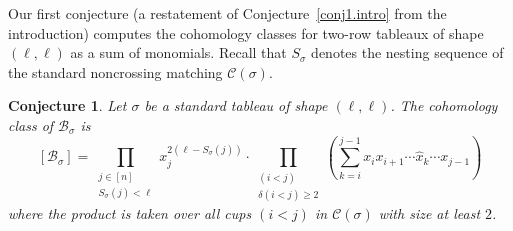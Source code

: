 \documentclass[11pt]{amsart}
\newtheorem{conj}[theorem]{Conjecture}
\theoremstyle{remark}
\theoremstyle{remark}
\theoremstyle{definition}
\theoremstyle{definition}
\theoremstyle{definition}
\numberwithin{equation}{section}
\newcommand{\gs}{\sigma}
\newcommand{\cb}{\mathcal{B}}
\newcommand{\cc}{\mathcal{C}}
\newcommand{\cupsigma}{\cc(\gs)}
\begin{document}
Our first conjecture (a restatement of Conjecture~\ref{conj1.intro} from the introduction) computes the cohomology classes for two-row tableaux of shape $(\ell,\ell)$ as a sum of monomials. Recall that $S_\gs$ denotes the nesting sequence of the standard noncrossing matching $\cupsigma$. 



\begin{conj}\label{conj:monomialproduct} 
Let $\sigma$ be a standard tableau of shape $(\ell, \ell)$. The cohomology class of $\cb_\gs$ is 
\[[\cb_\gs]=
\prod_{\substack{j\in [n]\\S_\gs(j)<\ell}} x_j^{2(\ell-S_\gs(j))}  \cdot  \prod_{\substack{(i<j)\\ \delta(i<j)\geq 2}} \left(  \sum_{k=i}^{j-1} x_ix_{i+1}\cdots \hat{x}_k \cdots x_{j-1} \right)
\]
where the product is taken over all cups $(i<j)$ in $\cupsigma$ with size at least $2$. 
\end{conj}
\end{document}
